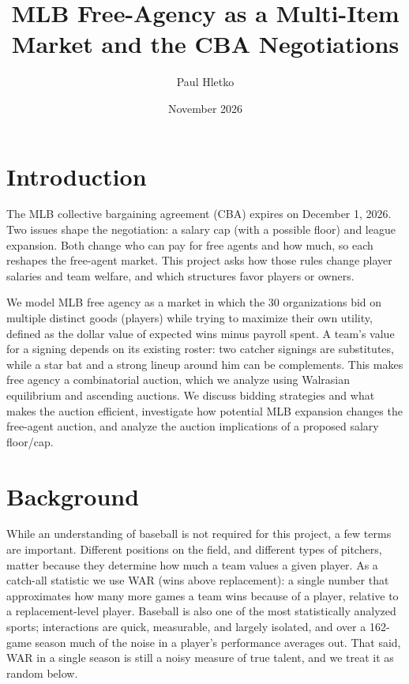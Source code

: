 \documentclass{article}
\title{MLB Free-Agency as a Multi-Item Market and the CBA Negotiations}
\author{Paul Hletko}
\date{November 2026}
\begin{document}
\maketitle

\section{Introduction}
The MLB collective bargaining agreement (CBA) expires on December 1, 2026. Two issues shape the negotiation: a salary cap (with a possible floor) and league expansion. Both change who can pay for free agents and how much, so each reshapes the free-agent market. This project asks how those rules change player salaries and team welfare, and which structures favor players or owners.

We model MLB free agency as a market in which the 30 organizations bid on multiple distinct goods (players) while trying to maximize their own utility, defined as the dollar value of expected wins minus payroll spent. A team's value for a signing depends on its existing roster: two catcher signings are substitutes, while a star bat and a strong lineup around him can be complements. This makes free agency a combinatorial auction, which we analyze using Walrasian equilibrium and ascending auctions. We discuss bidding strategies and what makes the auction efficient, investigate how potential MLB expansion changes the free-agent auction, and analyze the auction implications of a proposed salary floor/cap.

\section{Background}
While an understanding of baseball is not required for this project, a few terms are important. Different positions on the field, and different types of pitchers, matter because they determine how much a team values a given player. As a catch-all statistic we use WAR (wins above replacement): a single number that approximates how many more games a team wins because of a player, relative to a replacement-level player. Baseball is also one of the most statistically analyzed sports; interactions are quick, measurable, and largely isolated, and over a 162-game season much of the noise in a player's performance averages out. That said, WAR in a single season is still a noisy measure of true talent, and we treat it as random below.
\end{document}
